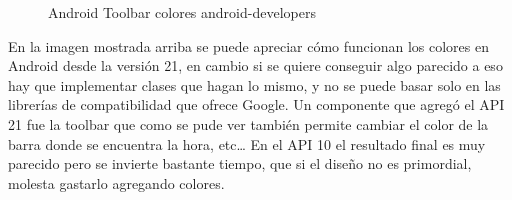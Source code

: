 \begin{figure}[H] 
  \begin{center} 
    \caption{Android Toolbar colores android-developers} 
    \label{fig:AndroidToolbar} 
  \end{center} 
\end{figure}

En la imagen mostrada arriba se puede apreciar cómo funcionan los colores en Android desde la versión 21, en cambio si se quiere conseguir algo parecido a eso hay que implementar clases que hagan lo mismo, y no se puede basar solo en las librerías de compatibilidad que ofrece Google.
Un componente que agregó el API 21 fue la toolbar que como se pude ver también permite cambiar el color de la barra donde se encuentra la hora, etc…
En el API 10 el resultado final es muy parecido pero se invierte bastante tiempo, que si el diseño no es primordial, molesta gastarlo agregando colores.

